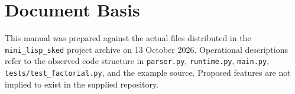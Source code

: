 \documentclass[11pt,a4paper,oneside]{report}
\begin{document}
\chapter{Document Basis}
This manual was prepared against the actual files distributed in the \texttt{mini\_lisp\_sked} project archive on 13 October 2026. Operational descriptions refer to the observed code structure in \texttt{parser.py}, \texttt{runtime.py}, \texttt{main.py}, \texttt{tests/test\_factorial.py}, and the example source. Proposed features are not implied to exist in the supplied repository.
\end{document}
